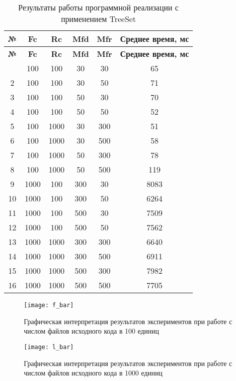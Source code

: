 \begin{longtable}{|c|c|c|c|c|c|}
    \caption{Результаты работы программной реализации с применением TreeSet}
    \label{tab:treeset}\\
    \hline
    \bfseries{№} & \bfseries{Fc} & \bfseries{Rc} & \bfseries{Mfd} & \bfseries{Mfr} & \bfseries{Среднее время, мс} \\
    \endfirsthead
    \bfseries{№} & \bfseries{Fc} & \bfseries{Rc} & \bfseries{Mfd} & \bfseries{Mfr} & \bfseries{Среднее время, мс} \\
    \endhead
    \endfoot
    \hline
    1 & 100 & 100 & 30 & 30 & 65 \\
    \hline
    2 & 100 & 100 & 30 & 50 & 71 \\
    \hline
    3 & 100 & 100 & 50 & 30 & 70 \\
    \hline
    4 & 100 & 100 & 50 & 50 & 52 \\
    \hline
    5 & 100 & 1000 & 30 & 300 & 51 \\
    \hline
    6 & 100 & 1000 & 30 & 500 & 58 \\
    \hline
    7 & 100 & 1000 & 50 & 300 & 78 \\
    \hline
    8 & 100 & 1000 & 50 & 500 & 119 \\
    \hline
    9 & 1000 & 100 & 300 & 30 & 8083 \\
    \hline
    10 & 1000 & 100 & 300 & 50 & 6264 \\
    \hline
    11 & 1000 & 100 & 500 & 30 & 7509 \\
    \hline
    12 & 1000 & 100 & 500 & 50 & 7562 \\
    \hline
    13 & 1000 & 1000 & 300 & 300 & 6640 \\
    \hline
    14 & 1000 & 1000 & 300 & 500 & 6911 \\
    \hline
    15 & 1000 & 1000 & 500 & 300 & 7982 \\
    \hline
    16 & 1000 & 1000 & 500 & 500 & 7705 \\
    \hline
\end{longtable}

\begin{figure}[H]
    \centering
    \texttt{[image: f\_bar]}
    \caption{Графическая интерпретация результатов экспериментов при работе с числом файлов исходного кода в 100 единиц}
    \label{fig:f_bar}
\end{figure}

\begin{figure}[H]
    \centering
    \texttt{[image: l\_bar]}
    \caption{Графическая интерпретация результатов экспериментов при работе с числом файлов исходного кода в 1000 единиц}
    \label{fig:l_bar}
\end{figure}

